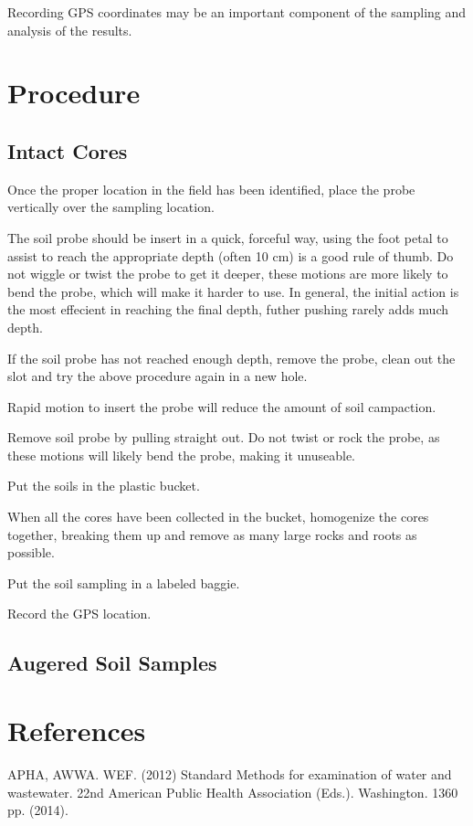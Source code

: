 \documentclass[12pt]{../SOP2}\usepackage[]{graphicx}\usepackage[]{color}
\begin{document}
\NP Recording GPS coordinates may be an important component of the sampling and analysis of the results. 

\section{Procedure}

\subsection*{Intact Cores}

\NP Once the proper location in the field has been identified, place the probe vertically over the sampling location.

\NP The soil probe should be insert in a quick, forceful way, using the foot petal to assist to reach the appropriate depth (often 10 cm) is a good rule of thumb. Do not wiggle or twist the probe to get it deeper, these motions are more likely to bend the probe, which will make it harder to use. In general, the initial action is the most effecient in reaching the final depth, futher pushing rarely adds much depth. 

\NP If the soil probe has not reached enough depth, remove the probe, clean out the slot and try the above procedure again in a new hole.

\NP Rapid motion to insert the probe will reduce the amount of soil campaction. 

\NP Remove soil probe by pulling straight out. Do not twist or rock the probe, as these motions will likely bend the probe, making it unuseable. 

\NP Put the soils in the plastic bucket.

\NP When all the cores have been collected in the bucket, homogenize the cores together, breaking them up and remove as many large rocks and roots as possible. 

\NP Put the soil sampling in a labeled baggie.

\NP Record the GPS location. 

\subsection*{Augered Soil Samples}

\section{References}

\NP APHA, AWWA. WEF. (2012) Standard Methods for examination of water and wastewater. 22nd American Public Health Association (Eds.). Washington. 1360 pp. (2014).
\end{document}
